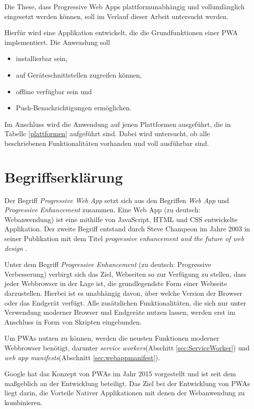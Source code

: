 Die These, dass Progressive Web Apps plattformunabhängig und vollumfänglich eingesetzt werden können, soll im Verlauf dieser Arbeit untersucht werden. 

Hierfür wird eine Applikation entwickelt, die die Grundfunktionen einer PWA implementiert. Die Anwendung soll 
 \begin{itemize}
     \item installierbar sein,
     \item auf Geräteschnittstellen zugreifen können,
     \item offline verfügbar sein und
     \item Push-Benachrichtigungen ermöglichen. 
 \end{itemize}

Im Anschluss wird die Anwendung auf jenen Plattformen ausgeführt, die in Tabelle \ref{plattformen} aufgeführt sind. Dabei wird untersucht, ob alle beschriebenen Funktionalitäten vorhanden und voll ausführbar sind. 

\section{Begriffserklärung}\label{se:Begriffserklaerung}

Der Begriff \textit{Progressive Web App} setzt sich aus den Begriffen \textit{Web App} und \textit{Progressive Enhancement} zusammen. Eine Web App (zu deutsch: Webanwendung) ist eine mithilfe von JavaScript, HTML und CSS entwickelte Applikation. Der zweite Begriff entstand durch Steve Champeon im Jahre 2003 in seiner Publikation mit dem Titel \textit{progressive enhancement and the future of web design} \cite{Champeon}.

Unter dem Begriff \textit{Progressive Enhancement} (zu deutsch: Progressive Verbesserung) verbirgt sich das Ziel, Webseiten so zur Verfügung zu stellen, dass jeder Webbrowser in der Lage ist, die grundlegendste Form einer Webseite darzustellen. Hierbei ist es unabhängig davon, über welche Version der Browser oder das Endgerät verfügt. 
Alle zusätzlichen Funktionalitäten, die sich nur unter Verwendung moderner Browser und Endgeräte nutzen lassen, werden erst im Anschluss in Form von Skripten eingebunden. 

Um PWAs nutzen zu können, werden die neusten Funktionen moderner Webbrowser benötigt, darunter \textit{service workers}(Abschitt \ref{sec:ServiceWorker}) und \textit{web app manifests}(Abschnitt \ref{sec:webappmanifest}). 

Google hat das Konzept von PWAs im Jahr 2015 vorgestellt und ist seit dem maßgeblich an der Entwicklung beteiligt. 
Das Ziel bei der Entwicklung von PWAs liegt darin, die Vorteile Nativer Applikationen mit denen der Webanwendung zu kombinieren. 


